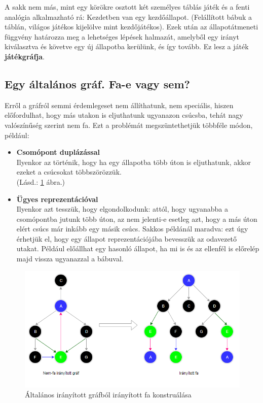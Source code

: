 \documentclass[twoside, a4paper, 12pt]{book}
\begin{document}
A sakk nem más, mint egy körökre osztott két személyes táblás játék és a fenti analógia alkalmazható rá: Kezdetben van egy kezdőállapot. (Felállított bábuk a táblán, világos játékos kijelölve mint kezdőjátékos). Ezek után az állapotátmeneti függvény határozza meg a lehetséges lépések halmazát, amelyből egy irányt kiválasztva és követve egy új állapotba kerülünk, és így tovább. Ez lesz a játék \textbf{játékgráfja}.

\subsection{Egy általános gráf. Fa-e vagy sem?}
Erről a gráfról semmi érdemlegeset nem állíthatunk, nem speciális, hiszen előfordulhat, hogy más utakon is eljuthatunk ugyanazon csúcsba, tehát nagy valószínűség szerint nem fa. Ezt a problémát megszüntethetjük többféle módon, például: 

\begin{itemize}
	\item \textbf{Csomópont duplázással} \\
	Ilyenkor az történik, hogy ha egy állapotba több úton is eljuthatunk, akkor ezeket a csúcsokat többszörözzük. \\
	(Lásd.: \ref{fig:game-graph-transformation} ábra.)
	
	\item \textbf{Ügyes reprezentációval} \\
	Ilyenkor azt tesszük, hogy elgondolkodunk: attól, hogy ugyanabba a csomópontba jutunk több úton, az nem jelenti-e esetleg azt, hogy a más úton elért csúcs már inkább egy másik csúcs. Sakkos példánál maradva: ezt úgy érhetjük el, hogy egy állapot reprezentációjába bevesszük az odavezető utakat. Például előállhat egy hasonló állapot, ha mi is és az ellenfél is előrelép majd vissza ugyanazzal a bábuval.
\end{itemize}

\begin{figure}[htbp]
	\centering
	\includegraphics[width=1.0\textwidth]{img/game-graph-transformation.png}
	\caption{Általános irányított gráfból irányított fa konstruálása}
	\label{fig:game-graph-transformation}
\end{figure}
\end{document}

